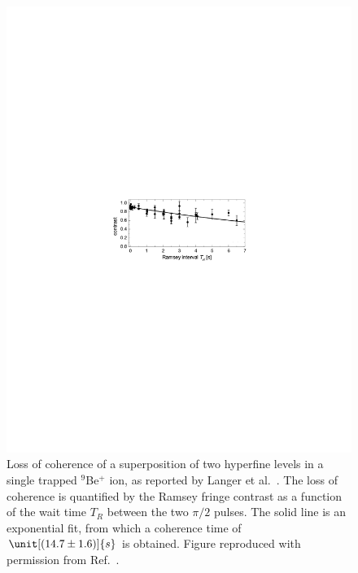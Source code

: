 \documentclass[3p,sort&compress,12pt]{elsarticle}
\begin{document}
\begin{figure}
\centering
\includegraphics[scale=0.9]{langer1.pdf} 
\caption{Loss of coherence of a superposition of two hyperfine levels in a single trapped $^9$Be$^+$ ion, as reported by Langer et al.\ \cite{Langer:2005:uu}. The loss of coherence is quantified by the Ramsey fringe contrast as a function of the wait time $T_R$ between the two $\pi/2$ pulses. The solid line is an exponential fit, from which a coherence time of $\unit[(14.7 \pm 1.6)]{s}$ is obtained.  Figure reproduced with permission from Ref.~\cite{Langer:2005:uu}.}
\label{fig:iondec}
\end{figure}
\end{document}
